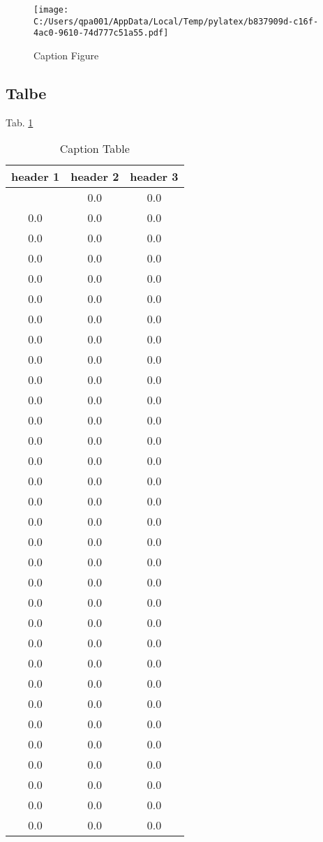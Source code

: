 \documentclass{article}%
\begin{document}
\begin{figure}[h!]%
\centering%
\texttt{[image: C:/Users/qpa001/AppData/Local/Temp/pylatex/b837909d-c16f-4ac0-9610-74d777c51a55.pdf]}%
\caption{Caption Figure}%
\label{figure:fig1}%
\end{figure}

%
\subsection{Talbe}%
\label{subsec:Talbe}%
Tab. \ref{table:tab1}%
\begin{longtable}{|c|c|c|}%
\caption{Caption Table}%
\label{table:tab1}\\%
\hline%
header 1&header 2&header 3\\%
\hline%
\endhead%
\hline%
\endfoot%
\hline%
\endlastfoot%
0.0&0.0&0.0\\%
0.0&0.0&0.0\\%
0.0&0.0&0.0\\%
0.0&0.0&0.0\\%
0.0&0.0&0.0\\%
0.0&0.0&0.0\\%
0.0&0.0&0.0\\%
0.0&0.0&0.0\\%
0.0&0.0&0.0\\%
0.0&0.0&0.0\\%
0.0&0.0&0.0\\%
0.0&0.0&0.0\\%
0.0&0.0&0.0\\%
0.0&0.0&0.0\\%
0.0&0.0&0.0\\%
0.0&0.0&0.0\\%
0.0&0.0&0.0\\%
0.0&0.0&0.0\\%
0.0&0.0&0.0\\%
0.0&0.0&0.0\\%
0.0&0.0&0.0\\%
0.0&0.0&0.0\\%
0.0&0.0&0.0\\%
0.0&0.0&0.0\\%
0.0&0.0&0.0\\%
0.0&0.0&0.0\\%
0.0&0.0&0.0\\%
0.0&0.0&0.0\\%
0.0&0.0&0.0\\%
0.0&0.0&0.0\\%
0.0&0.0&0.0\\%
0.0&0.0&0.0\\%

\end{longtable}
\end{document}
